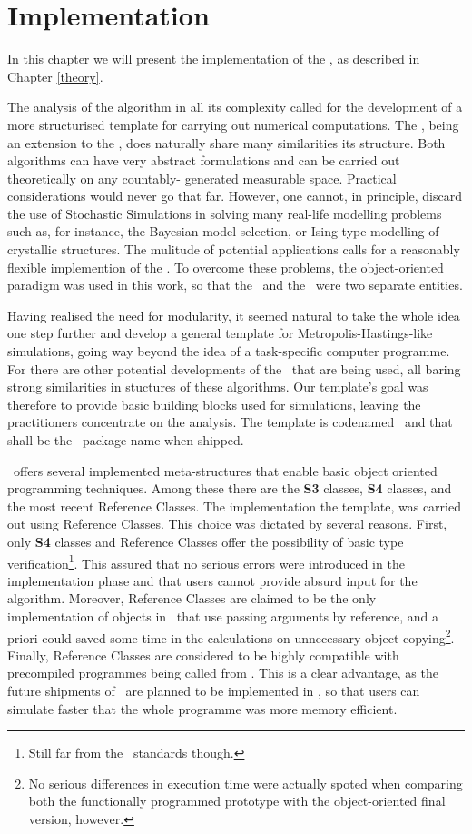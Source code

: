 \chapter{ Implementation }\label{Implementation}

In this chapter we will present the implementation of the \PTalgo, as described in Chapter \ref{theory}.

The analysis of the algorithm in all its complexity called for the development
of a more structurised template for carrying out numerical computations. The
\PTalgo, being an extension to the \MHalgo, does naturally share many similarities its structure. Both algorithms can have very
abstract formulations and can be carried out theoretically on any countably-
generated measurable space. Practical considerations would never go that far.
However, one cannot, in principle, discard the use of Stochastic Simulations in solving many real-life modelling problems such as, for instance, the Bayesian model selection, or Ising-type modelling of crystallic structures. The mulitude of potential applications calls for a reasonably flexible implemention of the \PTalgo. To overcome these problems, the object-oriented paradigm was used in this work, so that the \sspace\, and the \algo\, were two separate entities. 

Having realised the need for modularity, it seemed natural to take the whole idea one step further and develop a general template for Metropolis-Hastings-like simulations, going way beyond the idea of a task-specific computer programme. For there are other potential developments of the \MHalgo\, that are being used, all baring strong similarities in stuctures of these algorithms. Our template's goal was therefore to provide basic building blocks used for simulations, leaving the practitioners concentrate on the analysis. The template is codenamed \ssimul \, and that shall be the \RR\, package name when shipped.


\RR\, offers several implemented meta-structures that enable basic object oriented programming techniques. Among these there are the \textbf{S3} classes, \textbf{S4} classes, and the most recent Reference Classes. The implementation the template, was carried out using Reference Classes. This choice was dictated by several reasons. First, only \textbf{S4} classes and Reference Classes offer the possibility of basic type verification\footnote{Still far from the \Cpp\, standards though.}. This assured that no serious errors were introduced in the implementation phase and that users cannot provide absurd input for the algorithm. Moreover, Reference Classes are claimed to be the only implementation of objects in \RR\, that use passing arguments by reference, and a priori could saved some time in the calculations on unnecessary object copying\footnote{No serious differences in execution time were actually spoted when comparing both the functionally programmed prototype with the object-oriented final version, however.}. Finally, Reference Classes are considered to be highly compatible with \Cpp\, precompiled programmes being called from \RR. This is a clear advantage, as the future shipments of \ssimul\, are planned to be implemented in \Cpp, so that users can simulate faster that the whole programme was more memory efficient.   

